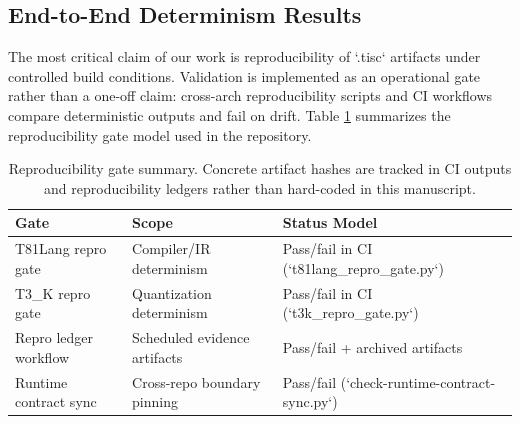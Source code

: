 \documentclass[sigconf, 10pt]{acmart}
\begin{document}
\subsection{End-to-End Determinism Results}
The most critical claim of our work is reproducibility of `.tisc` artifacts under controlled build conditions. Validation is implemented as an operational gate rather than a one-off claim: cross-arch reproducibility scripts and CI workflows compare deterministic outputs and fail on drift. Table \ref{tab:reproducibility} summarizes the reproducibility gate model used in the repository.
\begin{table}[h]
\centering
\caption{Reproducibility gate summary. Concrete artifact hashes are tracked in CI outputs and reproducibility ledgers rather than hard-coded in this manuscript.}
\label{tab:reproducibility}
\begin{tabular}{|l|l|l|}
\hline
\textbf{Gate} & \textbf{Scope} & \textbf{Status Model} \\
\hline
T81Lang repro gate & Compiler/IR determinism & Pass/fail in CI (`t81lang_repro_gate.py`) \\
T3\_K repro gate & Quantization determinism & Pass/fail in CI (`t3k_repro_gate.py`) \\
Repro ledger workflow & Scheduled evidence artifacts & Pass/fail + archived artifacts \\
Runtime contract sync & Cross-repo boundary pinning & Pass/fail (`check-runtime-contract-sync.py`) \\
\hline
\end{tabular}
\end{table}
\end{document}
